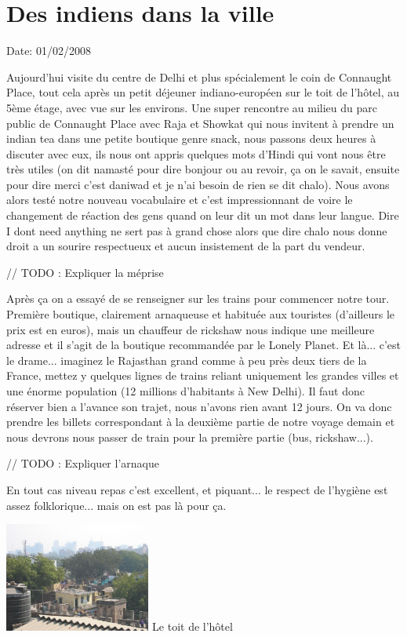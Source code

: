 \section{Des indiens dans la ville}

Date: 01/02/2008

\begin{multicols}{2}


Aujourd'hui visite du centre de Delhi et plus spécialement le coin de Connaught Place, tout cela après un petit déjeuner indiano-européen sur le toit de l’hôtel, au 5ème étage, avec vue sur les environs. Une super rencontre au milieu du parc public de Connaught Place avec Raja et Showkat qui nous invitent à prendre un indian tea dans une petite boutique genre snack, nous passons deux heures à discuter avec eux, ils nous ont appris quelques mots d’Hindi qui vont nous être très utiles (on dit namasté pour dire bonjour ou au revoir, ça on le savait, ensuite pour dire merci c’est daniwad et je n’ai besoin de rien se dit chalo). Nous avons alors testé notre nouveau vocabulaire et c’est impressionnant de voire le changement de réaction des gens quand on leur dit un mot dans leur langue. Dire I dont need anything ne sert pas à grand chose alors que dire chalo nous donne droit a un sourire respectueux et aucun insistement de la part du vendeur.

// TODO : Expliquer la méprise

Après ça on a essayé de se renseigner sur les trains pour commencer notre tour. Première boutique, clairement arnaqueuse et habituée aux touristes (d’ailleurs le prix est en euros), mais un chauffeur de rickshaw nous indique une meilleure adresse et il s’agit de la boutique recommandée par le Lonely Planet. Et là... c’est le drame... imaginez le Rajasthan grand comme à peu près deux tiers de la France, mettez y quelques lignes de trains reliant uniquement les grandes villes et une énorme population (12 millions d'habitants à New Delhi). Il faut donc réserver bien a l’avance son trajet, nous n’avons rien avant 12 jours. On va donc prendre les billets correspondant à la deuxième partie de notre voyage demain et nous devrons nous passer de train pour la première partie (bus, rickshaw...).

// TODO : Expliquer l'arnaque

En tout cas niveau repas c’est excellent, et piquant... le respect de l’hygiène est assez folklorique... mais on est pas là pour ça.

\hspace*{-0.65cm}
\includegraphics[width=4.8cm]{articles/Des-indiens-dans-la-ville/toithotel.jpg}
Le toit de l'hôtel


\end{multicols}
